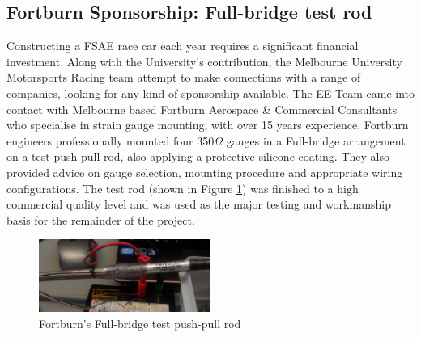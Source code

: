 \subsection{Fortburn Sponsorship: Full-bridge test rod}
Constructing a FSAE race car each year requires a significant financial investment. Along with the University's contribution, the Melbourne University Motorsports Racing team attempt to make connections with a range of companies, looking for any kind of sponsorship available. The EE Team came into contact with Melbourne based Fortburn Aerospace \& Commercial Consultants who specialise in strain gauge mounting, with over 15 years experience. Fortburn engineers professionally mounted four 350$\Omega$ gauges in a Full-bridge arrangement on a test push-pull rod, also applying a protective silicone coating. They also provided advice on gauge selection, mounting procedure and appropriate wiring configurations. The test rod (shown in Figure \ref{fig:IMG_SG_Fortburn_Rod}) was finished to a high commercial quality level and was used as the major testing and workmanship basis for the remainder of the project.\\

\begin{figure}[h!]
	\centering
	\includegraphics[width=0.5\textwidth]{Images/Strain_Gauges/IMG_SG_Fortburn_Rod.jpg}
	\caption{Fortburn's Full-bridge test push-pull rod}	
	\label{fig:IMG_SG_Fortburn_Rod}
\end{figure}


